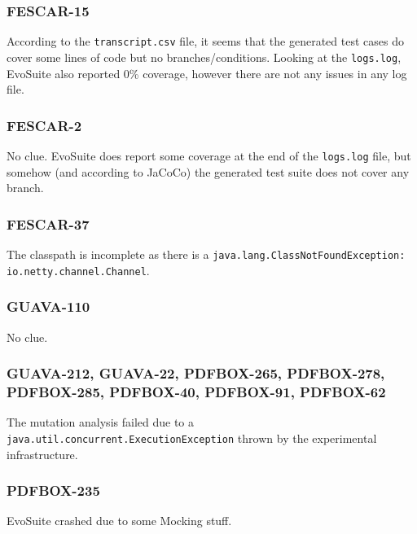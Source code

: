\documentclass[sigconf]{acmart}
\newcommand{\EVOSUITE}{{\sc EvoSuite}\xspace}
\begin{document}

\subsubsection*{FESCAR-15} According to the \texttt{transcript.csv} file, it
seems that the generated test cases do cover some lines of code but no
branches/conditions.  Looking at the \texttt{logs.log}, \EVOSUITE also reported
0\% coverage, however there are not any issues in any log file.


\subsubsection*{FESCAR-2} No clue.  \EVOSUITE does report some coverage at the
end of the \texttt{logs.log} file, but somehow (and according to JaCoCo) the
generated test suite does not cover any branch.


\subsubsection*{FESCAR-37} The classpath is incomplete as there is a
\texttt{java.lang.ClassNotFoundException: io.netty.channel.Channel}.


\subsubsection*{GUAVA-110} No clue.


\subsubsection*{GUAVA-212, GUAVA-22, PDFBOX-265, PDFBOX-278, PDFBOX-285,
PDFBOX-40, PDFBOX-91, PDFBOX-62} The mutation analysis failed due to a
\texttt{java.util.concurrent.ExecutionException} thrown by the experimental
infrastructure.


\subsubsection*{PDFBOX-235} \EVOSUITE crashed due to some Mocking stuff.
\end{document}
